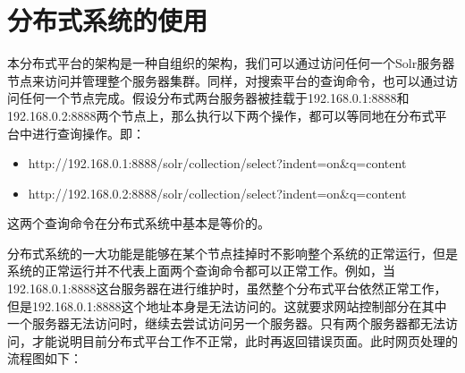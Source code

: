 \section{分布式系统的使用}
本分布式平台的架构是一种自组织的架构，我们可以通过访问任何一个Solr服务器节点来访问并管理整个服务器集群。同样，对搜索平台的查询命令，也可以通过访问任何一个节点完成。假设分布式两台服务器被挂载于192.168.0.1:8888和192.168.0.2:8888两个节点上，那么执行以下两个操作，都可以等同地在分布式平台中进行查询操作。即：
\begin{itemize}
\item http://192.168.0.1:8888/solr/collection/select?indent=on\&q=content
\item http://192.168.0.2:8888/solr/collection/select?indent=on\&q=content
\end{itemize}
这两个查询命令在分布式系统中基本是等价的。

分布式系统的一大功能是能够在某个节点挂掉时不影响整个系统的正常运行，但是系统的正常运行并不代表上面两个查询命令都可以正常工作。例如，当192.168.0.1:8888这台服务器在进行维护时，虽然整个分布式平台依然正常工作，但是192.168.0.1:8888这个地址本身是无法访问的。这就要求网站控制部分在其中一个服务器无法访问时，继续去尝试访问另一个服务器。只有两个服务器都无法访问，才能说明目前分布式平台工作不正常，此时再返回错误页面。此时网页处理的流程图如下：

\begin{figure}[!htp]
    \centering
    \resizebox{6cm}{!}{}
\end{figure}